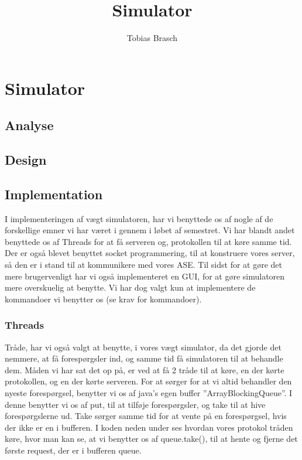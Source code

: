 \documentclass[a4paper]{article}
\title{Simulator}
\author{
  Tobias Brasch
}
\begin{document}
\maketitle

\section{Simulator} %

\subsection{Analyse} %


\subsection{Design} %


\subsection{Implementation} %

I implementeringen af vægt simulatoren, har vi benyttede os af nogle af de forskellige emner vi har været i gennem i løbet af semestret. Vi har blandt andet benyttede os af Threads for at få serveren og, protokollen til at køre samme tid. Der er også blevet benyttet socket programmering, til at konstruere vores server, så den er i stand til at kommunikere med vores ASE. Til sidst for at gøre det mere brugervenligt har vi også implementeret en GUI, for at gøre simulatoren mere overskuelig at benytte. Vi har dog valgt kun at implementere de kommandoer vi benytter os (se krav for kommandoer).

\subsubsection{Threads} %

Tråde, har vi også valgt at benytte, i vores vægt simulator, da det gjorde det nemmere, at få forespørgsler ind, og samme tid få simulatoren til at behandle dem. Måden vi har sat det op på, er ved at få 2 tråde til at køre, en der kørte protokollen, og en der kørte serveren. For at sørger for at vi altid behandler den nyeste forespørgsel, benytter vi os af java’s egen buffer ”ArrayBlockingQueue”. I denne benytter vi os af put, til at tilføje forespørgsler, og take til at hive forespørgslerne ud. Take sørger samme tid for at vente på en forespørgsel, hvis der ikke er en i bufferen. I koden neden under ses hvordan vores protokol tråden køre, hvor man kan se, at vi benytter os af queue.take(), til at hente og fjerne det første request, der er i bufferen queue.
\end{document}

